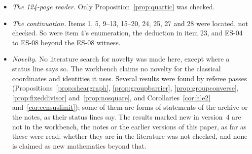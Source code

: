 \begin{itemize}
\item \emph{The 124-page reader.} Only Proposition~\ref{prop:quartic} was checked.
\item \emph{The continuation.} Items 1, 5, 9--13, 15--20, 24, 25, 27 and 28 were located, not checked. So were item 4's enumeration, the deduction in item 23, and ES-04 to ES-08 beyond the ES-08 witness.
\item \emph{Novelty.} No literature search for novelty was made here, except where a status line says so. The workbench claims no novelty for the classical coordinates and identities it uses. Several results were found by referee passes (Propositions~\ref{prop:sheargraph}, \ref{prop:groupbarrier}, \ref{prop:groupconverse}, \ref{prop:fixeddivisor} and~\ref{prop:nosquare}, and Corollaries~\ref{cor:hle2} and~\ref{cor:censuslimit}); some of them are forms of statements of the archive or the notes, as their status lines say. The results marked new in version~4 are not in the workbench, the notes or the earlier versions of this paper, as far as these were read; whether they are in the literature was not checked, and none is claimed as new mathematics beyond that.
\end{itemize}

